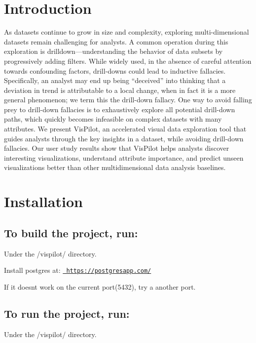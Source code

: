 \hypertarget{index_intro_sec}{}\section{Introduction}\label{index_intro_sec}
As datasets continue to grow in size and complexity, exploring multi-\/dimensional datasets remain challenging for analysts. A common operation during this exploration is drilldown—understanding the behavior of data subsets by progressively adding filters. While widely used, in the absence of careful attention towards confounding factors, drill-\/downs could lead to inductive fallacies. Specifically, an analyst may end up being “deceived” into thinking that a deviation in trend is attributable to a local change, when in fact it is a more general phenomenon; we term this the drill-\/down fallacy. One way to avoid falling prey to drill-\/down fallacies is to exhaustively explore all potential drill-\/down paths, which quickly becomes infeasible on complex datasets with many attributes. We present Vis\+Pilot, an accelerated visual data exploration tool that guides analysts through the key insights in a dataset, while avoiding drill-\/down fallacies. Our user study results show that Vis\+Pilot helps analysts discover interesting visualizations, understand attribute importance, and predict unseen visualizations better than other multidimensional data analysis baselines.\hypertarget{index_install_sec}{}\section{Installation}\label{index_install_sec}
\hypertarget{index_step1}{}\subsection{To build the project, run\+:}\label{index_step1}

\begin{DoxyCode}{0}
\end{DoxyCode}
 Under the {\ttfamily /vispilot/} directory.

Install postgres at\+: \href{https://postgresapp.com/}{\texttt{ https\+://postgresapp.\+com/}}

If it doesn\textquotesingle{}t work on the current port(5432), try a another port. 
\begin{DoxyCode}{0}
\DoxyCodeLine{}
\end{DoxyCode}
\hypertarget{index_step2}{}\subsection{To run the project, run\+:}\label{index_step2}

\begin{DoxyCode}{0}
\end{DoxyCode}
 Under the {\ttfamily /vispilot/} directory. 